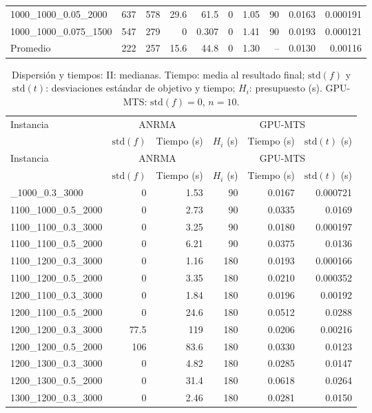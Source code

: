 \begin{landscape}
\begin{longtable}{lrrrrrrrrr}
1000\_1000\_0.05\_2000 & 637 & 578 & 29.6 & 61.5 & 0 & 1.05 & 90 & 0.0163 & 0.000191\\
1000\_1000\_0.075\_1500 & 547 & 279 & 0 & 0.307 & 0 & 1.41 & 90 & 0.0193 & 0.000121\\
\midrule
Promedio & 222 & 257 & 15.6 & 44.8 & 0 & 1.30 & -- & 0.0130 & 0.00116\\
\end{longtable}\clearpage
\footnotesize\setlength{\tabcolsep}{4pt}\renewcommand{\arraystretch}{.88}
\begin{longtable}{lrrrrr}
\caption{Dispersión y tiempos: II: medianas. Tiempo: media al resultado final; $\mathrm{std}(f)$ y $\mathrm{std}(t)$: desviaciones estándar de objetivo y tiempo; $H_i$: presupuesto (s). GPU-MTS: $\mathrm{std}(f)=0$, $n=10$.}\\
\toprule
Instancia & \multicolumn{2}{c}{ANRMA} & \multicolumn{3}{c}{GPU-MTS}\\
 & $\mathrm{std}(f)$ & Tiempo (s) & $H_i$ (s) & Tiempo (s) & $\mathrm{std}(t)$ (s)\\
\midrule\endfirsthead
Instancia & \multicolumn{2}{c}{ANRMA} & \multicolumn{3}{c}{GPU-MTS}\\
 & $\mathrm{std}(f)$ & Tiempo (s) & $H_i$ (s) & Tiempo (s) & $\mathrm{std}(t)$ (s)\\
\midrule\endhead
\bottomrule\endlastfoot
1100\_1000\_0.3\_3000 & 0 & 1.53 & 90 & 0.0167 & 0.000721\\
1100\_1000\_0.5\_2000 & 0 & 2.73 & 90 & 0.0335 & 0.0169\\
1100\_1100\_0.3\_3000 & 0 & 3.25 & 90 & 0.0180 & 0.000197\\
1100\_1100\_0.5\_2000 & 0 & 6.21 & 90 & 0.0375 & 0.0136\\
1100\_1200\_0.3\_3000 & 0 & 1.16 & 180 & 0.0193 & 0.000166\\
1100\_1200\_0.5\_2000 & 0 & 3.35 & 180 & 0.0210 & 0.000352\\
1200\_1100\_0.3\_3000 & 0 & 1.84 & 180 & 0.0196 & 0.00192\\
1200\_1100\_0.5\_2000 & 0 & 24.6 & 180 & 0.0512 & 0.0288\\
1200\_1200\_0.3\_3000 & 77.5 & 119 & 180 & 0.0206 & 0.00216\\
1200\_1200\_0.5\_2000 & 106 & 83.6 & 180 & 0.0330 & 0.0123\\
1200\_1300\_0.3\_3000 & 0 & 4.82 & 180 & 0.0285 & 0.0147\\
1200\_1300\_0.5\_2000 & 0 & 31.4 & 180 & 0.0618 & 0.0264\\
1300\_1200\_0.3\_3000 & 0 & 2.46 & 180 & 0.0281 & 0.0150\\

\end{longtable}
\end{landscape}
